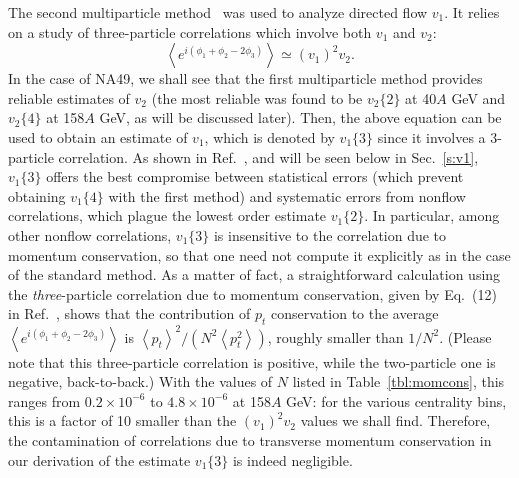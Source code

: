 \documentclass[aps,prc,superscriptaddress,showpacs,floatfix,nofootinbib]{revtex4}
\newcommand{\mean}[1]{\left\langle #1 \right\rangle}
\begin{document}
The second multiparticle method~\cite{Borghini:2002vp} was used to
analyze directed flow $v_1$. It relies on a study of {\rm
three}-particle correlations which involve both $v_1$ and $v_2$:
\begin{equation}
\label{v1/2idea}
\mean{e^{i(\phi_1+\phi_2-2\phi_3)}}\simeq (v_1)^2 v_2.
\end{equation}
In the case of NA49, we shall see that the first multiparticle method
provides reliable estimates of $v_2$ (the most reliable was found to
be $v_2\{2\}$ at 40$A$ GeV and $v_2\{4\}$ at 158$A$ GeV, as
will be discussed later).  Then, the above equation can be used to
obtain an estimate of $v_1$, which is denoted by $v_1\{3\}$ since it
involves a $3$-particle correlation.  As shown in Ref.\
\cite{Borghini:2002vp}, and will be seen below in Sec.~\ref{s:v1},
$v_1\{3\}$ offers the best compromise between statistical errors
(which prevent obtaining $v_1\{4\}$ with the first method) and
systematic errors from nonflow correlations, which plague the lowest
order estimate $v_1\{2\}$.  In particular, among other nonflow
correlations, $v_1\{3\}$ is insensitive to the correlation due to
momentum conservation, so that one need not compute it explicitly as
in the case of the standard method.  As a matter of fact, a
straightforward calculation using the {\em three}-particle correlation
due to momentum conservation, given by Eq.~(12) in
Ref.~\cite{Borghini:2003ur}, shows that the contribution of $p_t$
conservation to the average $\mean{e^{i(\phi_1+\phi_2-2\phi_3)}}$ is
$\mean{p_t}^2 / (N^2
\mean{p_t^2})$, roughly smaller than $1/N^2$.  (Please note that this
three-particle correlation is positive, while the two-particle one is
negative, back-to-back.)  With the values of $N$ listed in
Table~\ref{tbl:momcons}, this ranges from $0.2\times 10^{-6}$ to
$4.8\times 10^{-6}$ at 158$A$ GeV: for the various centrality
bins, this is a factor of 10 smaller than the $(v_1)^2 v_2$ values we
shall find. Therefore, the contamination of correlations due to
transverse momentum conservation in our derivation of the estimate
$v_1\{3\}$ is indeed negligible.
\end{document}
